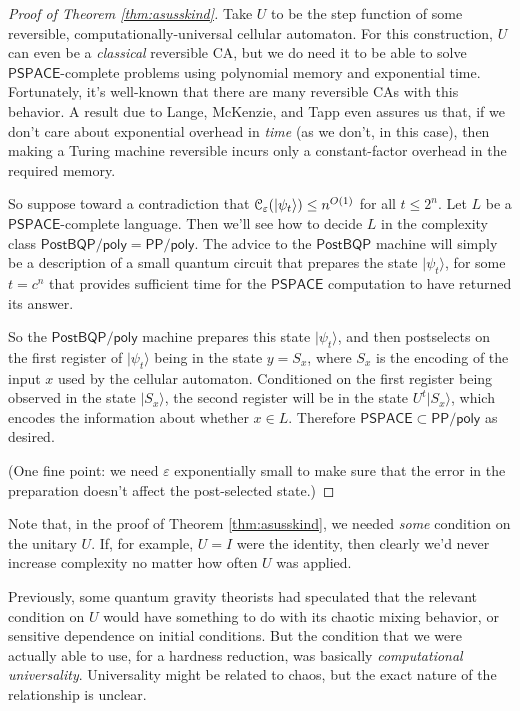 \documentclass[11pt]{report}
\theoremstyle{plain}
\theoremstyle{definition}
\newcommand{\eps}{\varepsilon}
\renewcommand{\ket}[1]{|#1\rangle}
\begin{document}
\begin{proof}[Proof of Theorem \ref{thm:asusskind}]
Take $U$ to be the step function of some reversible, computationally-universal cellular automaton.  For this construction, $U$ can even be a {\em classical} reversible CA, but we do need it to be able to solve $\mathsf{PSPACE}$-complete problems using polynomial memory and exponential time.  Fortunately, it's well-known that there are many reversible CAs with this behavior.  A result due to Lange, McKenzie, and Tapp \cite{lmt} even assures us that, if we don't care about exponential overhead in {\em time} (as we don't, in this case), then making a Turing machine reversible incurs only a constant-factor overhead in the required memory.

So suppose toward a contradiction that
${\cal C}_\eps(\ket{\psi_t}) \le n^{O(1)}$ for all $t \le 2^n$. Let $L$ be a $\mathsf{PSPACE}$-complete language.  Then we'll see how to decide $L$ in the complexity class $\mathsf{PostBQP/poly} = \mathsf{PP/poly}$.  The advice to the $\mathsf{PostBQP}$ machine will simply be a description of a small quantum circuit that prepares the state $\ket{\psi_t}$, for some $t=c^n$ that provides sufficient time for the $\mathsf{PSPACE}$ computation to have returned its answer.

So the $\mathsf{PostBQP/poly}$ machine prepares this state $\ket{\psi_t}$, and then postselects on the first register of $\ket{\psi_t}$ being in the state $y = S_x$, where $S_x$ is the encoding of the input $x$ used by the cellular automaton.  Conditioned on the first register being observed in the state $\ket{S_x}$, the second register will be in the state $U^t \ket{S_x}$, which encodes the information about whether $x\in L$.  Therefore $\mathsf{PSPACE} \subset \mathsf{PP/poly}$ as desired.

(One fine point: we need $\eps$ exponentially small to make sure that the error in the preparation doesn't affect the post-selected state.)
\end{proof}

Note that, in the proof of Theorem \ref{thm:asusskind}, we needed {\em some} condition on the unitary $U$.  If, for example, $U=I$ were the identity, then clearly we'd never increase complexity no matter how often $U$ was applied.

Previously, some quantum gravity theorists had speculated that the relevant condition on $U$ would have something to do with its chaotic mixing behavior, or sensitive dependence on initial conditions.  But the condition that we were actually able to use, for a hardness reduction, was basically {\em computational universality}.  Universality might be related to chaos, but the exact nature of the relationship is unclear.
\end{document}
